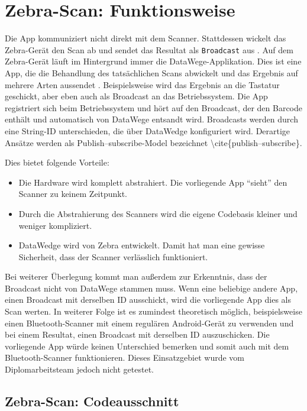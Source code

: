 \hypertarget{zebra-scan-funktionsweise}{%
\section{Zebra-Scan: Funktionsweise}\label{zebra-scan-funktionsweise}}

Die App kommuniziert nicht direkt mit dem Scanner. Stattdessen wickelt
das Zebra-Gerät den Scan ab und sendet das Resultat als
\texttt{Broadcast} aus \cite{broadcast}. Auf dem Zebra-Gerät läuft im
Hintergrund immer die DataWege-Applikation. Dies ist eine App, die die
Behandlung des tatsächlichen Scans abwickelt und das Ergebnis auf
mehrere Arten aussendet \cite{datawedge}. Beispielsweise wird das
Ergebnis an die Tastatur geschickt, aber eben auch als Broadcast an das
Betriebssystem. Die App registriert sich beim Betriebssystem und hört
auf den Broadcast, der den Barcode enthält und automatisch von DataWege
entsandt wird. Broadcasts werden durch eine String-ID unterschieden, die
über DataWedge konfiguriert wird. Derartige Ansätze werden als
Publish--subscribe-Model bezeichnet
\textbackslash cite\{publish--subscribe\}.

Dies bietet folgende Vorteile:

\begin{itemize}
\tightlist
\item
  Die Hardware wird komplett abstrahiert. Die vorliegende App ``sieht''
  den Scanner zu keinem Zeitpunkt.
\item
  Durch die Abstrahierung des Scanners wird die eigene Codebasis kleiner
  und weniger kompliziert.
\item
  DataWedge wird von Zebra entwickelt. Damit hat man eine gewisse
  Sicherheit, dass der Scanner verlässlich funktioniert.
\end{itemize}

Bei weiterer Überlegung kommt man außerdem zur Erkenntnis, dass der
Broadcast nicht von DataWege stammen muss. Wenn eine beliebige andere
App, einen Broadcast mit derselben ID ausschickt, wird die vorliegende
App dies als Scan werten. In weiterer Folge ist es zumindest theoretisch
möglich, beispielsweise einen Bluetooth-Scanner mit einem regulären
Android-Gerät zu verwenden und bei einem Resultat, einen Broadcast mit
derselben ID auszuschicken. Die vorliegende App würde keinen Unterschied
bemerken und somit auch mit dem Bluetooth-Scanner funktionieren. Dieses
Einsatzgebiet wurde vom Diplomarbeitsteam jedoch nicht getestet.

\hypertarget{zebra-scan-codeausschnitt}{%
\subsection{Zebra-Scan:
Codeausschnitt}\label{zebra-scan-codeausschnitt}}

